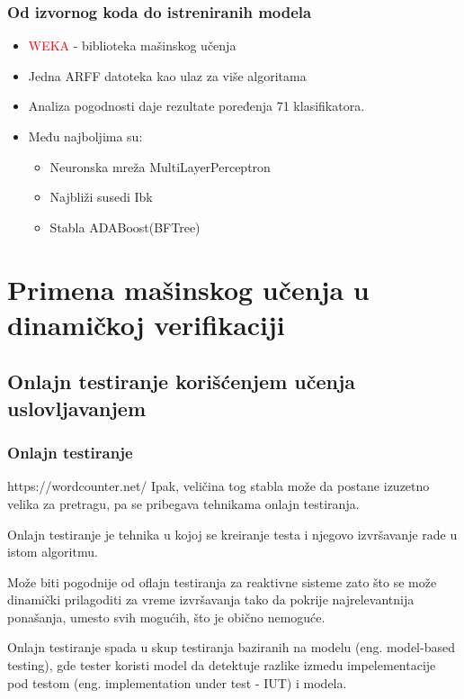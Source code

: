 \documentclass[11pt]{beamer}
\theoremstyle{definition}
\begin{document}
{\begin{frame}
\frametitle{Od izvornog koda do istreniranih modela}
\begin{itemize}


\item \textcolor{red}{WEKA} - biblioteka mašinskog učenja
\item Jedna ARFF datoteka kao ulaz za više algoritama

\item Analiza pogodnosti daje rezultate poređenja 71 klasifikatora.

\item Među najboljima su:
\begin{itemize}
	\item Neuronska mreža MultiLayerPerceptron
	\item Najbliži susedi Ibk
	\item Stabla ADABoost(BFTree)
\end{itemize}
\end{itemize}
\end{frame}



\section{Primena mašinskog učenja u dinamičkoj verifikaciji}
\label{sec:dinamcikaPrimena}

\subsection{Onlajn testiranje korišćenjem učenja uslovljavanjem}
\label{subsec:online-rl}
\begin{frame}
\frametitle{Onlajn testiranje}
https://wordcounter.net/
Ipak, veličina tog stabla može da postane izuzetno velika za pretragu, pa se pribegava tehnikama onlajn testiranja.

Onlajn testiranje je tehnika u kojoj se kreiranje testa i njegovo izvršavanje rade u istom algoritmu.

Može biti pogodnije od oflajn testiranja za reaktivne sisteme zato što se može dinamički prilagoditi za vreme izvršavanja tako da pokrije najrelevantnija ponašanja, umesto svih mogućih, što je obično nemoguće.

Onlajn testiranje spada u skup testiranja baziranih na modelu (eng. model-based testing), gde tester koristi model da detektuje razlike izmedu impelementacije pod testom (eng. implementation under test - IUT) i modela.
\end{frame}

}
\end{document}
